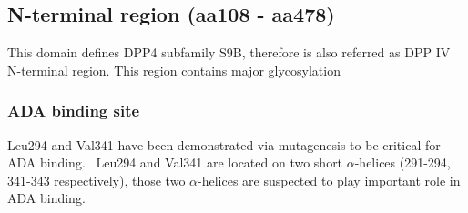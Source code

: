 \subsection{N-terminal region (aa108 - aa478)}

This domain defines DPP4 subfamily S9B, therefore is also referred as DPP IV N-terminal region. This region contains major glycosylation 

\subsubsection{ADA binding site}
Leu294 and Val341 have been demonstrated via mutagenesis to be critical for ADA binding.~\cite{Abbott_1999} Leu294 and Val341 are located on two short $\alpha$-helices (291-294, 341-343 respectively), those two $\alpha$-helices are suspected to play important role in ADA binding. 